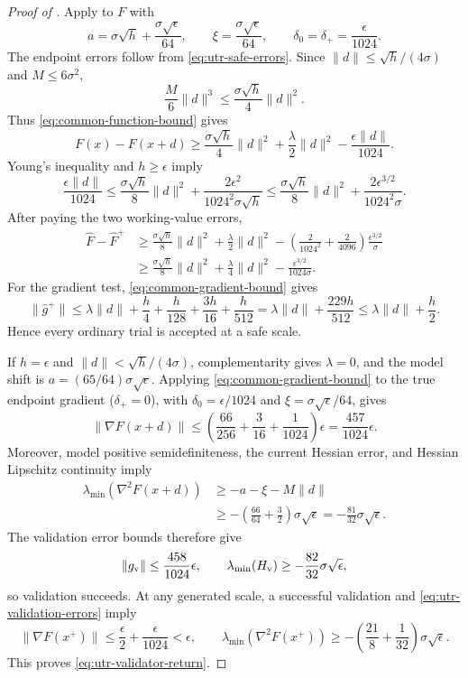 \documentclass{article}
\begin{document}
\begin{proof}[Proof of ]
Apply  to $F$ with
\[
 a=\sigma\sqrt h+\frac{\sigma\sqrt\epsilon}{64},
 \qquad
 \xi=\frac{\sigma\sqrt\epsilon}{64},
 \qquad
 \delta_0=\delta_+=\frac{\epsilon}{1024}.
\]
The endpoint errors follow from \eqref{eq:utr-safe-errors}.
Since $\|d\|\le\sqrt h/(4\sigma)$ and $M\le6\sigma^2$,
\[
 \frac{M}{6}\|d\|^3\le\frac{\sigma\sqrt h}{4}\|d\|^2.
\]
Thus \eqref{eq:common-function-bound} gives
\[
 F(x)-F(x+d)
 \ge\frac{\sigma\sqrt h}{4}\|d\|^2
       +\frac{\lambda}{2}\|d\|^2-\frac{\epsilon\|d\|}{1024}.
\]
Young's inequality and $h\ge\epsilon$ imply
\[
 \frac{\epsilon\|d\|}{1024}
 \le\frac{\sigma\sqrt h}{8}\|d\|^2+
       \frac{2\epsilon^2}{1024^2\sigma\sqrt h}
 \le\frac{\sigma\sqrt h}{8}\|d\|^2
       +\frac{2\epsilon^{3/2}}{1024^2\sigma}.
\]
After paying the two working-value errors,
\begin{align*}
 \widehat F-\widehat F^+
 &\ge\frac{\sigma\sqrt h}{8}\|d\|^2+\frac{\lambda}{2}\|d\|^2
       -\left(\frac{2}{1024^2}+\frac{2}{4096}\right)
          \frac{\epsilon^{3/2}}{\sigma}\\
 &\ge\frac{\sigma\sqrt h}{8}\|d\|^2+\frac{\lambda}{4}\|d\|^2
       -\frac{\epsilon^{3/2}}{1024\sigma}.
\end{align*}
For the gradient test, \eqref{eq:common-gradient-bound} gives
\[
 \|\widehat g^+\|
 \le\lambda\|d\|+\frac h4+\frac h{128}
                    +\frac{3h}{16}+\frac h{512}
 =\lambda\|d\|+\frac{229h}{512}
 \le\lambda\|d\|+\frac h2.
\]
Hence every ordinary trial is accepted at a safe scale.

If $h=\epsilon$ and $\|d\|<\sqrt h/(4\sigma)$,
complementarity gives
$\lambda=0$, and the model shift is
$a=(65/64)\sigma\sqrt\epsilon$.  Applying
\eqref{eq:common-gradient-bound} to the true endpoint gradient
($\delta_+=0$), with
$\delta_0=\epsilon/1024$ and $\xi=\sigma\sqrt\epsilon/64$,
gives
\[
 \|\nabla F(x+d)\|
 \le\left(\frac{66}{256}+\frac3{16}+\frac1{1024}\right)\epsilon
 =\frac{457}{1024}\epsilon.
\]
Moreover, model positive semidefiniteness, the current Hessian error,
and Hessian Lipschitz continuity imply
\begin{align*}
 \lambda_{\min}(\nabla^2F(x+d))
 &\ge-a-\xi-M\|d\|\\
 &\ge-\left(\frac{66}{64}+\frac32\right)\sigma\sqrt\epsilon
 =-\frac{81}{32}\sigma\sqrt\epsilon.
\end{align*}
The validation error bounds therefore give
\[
 \|g_{\rm v}\|\le\frac{458}{1024}\epsilon,
 \qquad
 \lambda_{\min}(H_{\rm v})
 \ge-\frac{82}{32}\sigma\sqrt\epsilon,
\]
so validation succeeds.  At any generated scale, a successful
validation and \eqref{eq:utr-validation-errors} imply
\[
 \|\nabla F(x^+)\|
 \le\frac\epsilon2+\frac\epsilon{1024}<\epsilon,
 \qquad
 \lambda_{\min}(\nabla^2F(x^+))
 \ge-\left(\frac{21}{8}+\frac1{32}\right)\sigma\sqrt\epsilon.
\]
This proves \eqref{eq:utr-validator-return}.
\end{proof}
\end{document}
